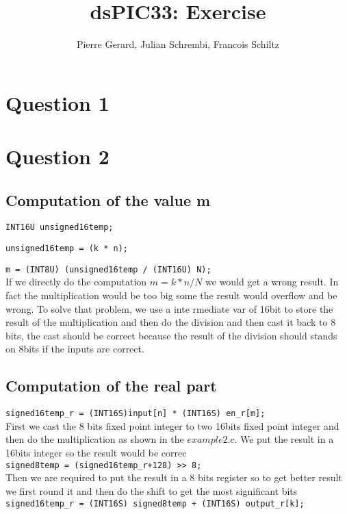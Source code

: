 \documentclass[a4paper]{article}
\title{dsPIC33: Exercise}
\author{Pierre Gerard, Julian Schrembi, Francois Schiltz}
\begin{document}
\maketitle

\section{Question 1}


\section{Question 2}

\subsection{Computation of the value m}


\verb|INT16U unsigned16temp;|

\verb|unsigned16temp = (k * n);|

\verb|m = (INT8U) (unsigned16temp / (INT16U) N);|
\\

If we directly do the computation $ m = k*n/N $ we would get a wrong result. In fact the multiplication would be too big some the result would overflow and be wrong. To solve that problem, we use a inte rmediate var of 16bit to store the result of the multiplication and then do the division and then cast it back to 8 bits, the cast should be correct because the result of the division should stands on 8bits if the inputs are correct.

\subsection{Computation of the real part}

\verb|signed16temp_r = (INT16S)input[n] * (INT16S) en_r[m];|
\\
First we cast the 8 bits fixed point integer to two 16bits fixed point integer and then do the multiplication as shown in the $example2.c$. We put the result in a 16bits integer so the result would be correc\\
\verb|signed8temp = (signed16temp_r+128) >> 8;|
\\
Then we are required to put the result in a 8 bits register so to get better result we first round it  and then do the shift to get the most significant bits
\\
\verb|signed16temp_r = (INT16S) signed8temp + (INT16S) output_r[k];|
\\
\end{document}
